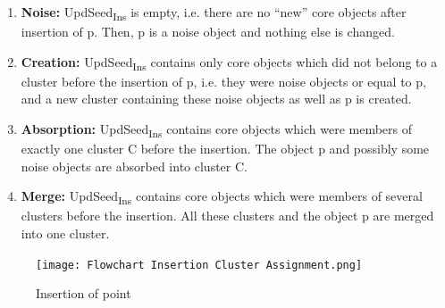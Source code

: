 \documentclass[acmsmall]{acmart}
\begin{document}
\begin{enumerate}
\begin{itemize}
        \begin{enumerate}
            \item \textbf{Noise: }
            {UpdSeed\textsubscript{Ins}} is empty, i.e. there are no “new” core objects after insertion of p. Then, p is a noise object and nothing else is changed.
            \item \textbf{Creation: } {UpdSeed\textsubscript{Ins}} contains only core objects which did not belong to a cluster before the insertion of p, i.e. they were noise objects or equal to p, and a new cluster containing these noise objects as well as p is created.
            \item \textbf{Absorption: } {UpdSeed\textsubscript{Ins}} contains core objects which were members of exactly one cluster C before the insertion. The object p and possibly some noise objects are absorbed into cluster C.
            \item \textbf{Merge: } {UpdSeed\textsubscript{Ins}} contains core objects which were members of several clusters before the insertion. All these clusters and the object p are merged into one cluster. \\
        \end{enumerate}
        
        \begin{figure}[!h]
            \centering
            \texttt{[image: Flowchart Insertion Cluster Assignment.png]}
            \caption{Insertion of point}
            \label{fig:my_label}
        \end{figure}
        

\end{itemize}
\end{enumerate}
\end{document}

